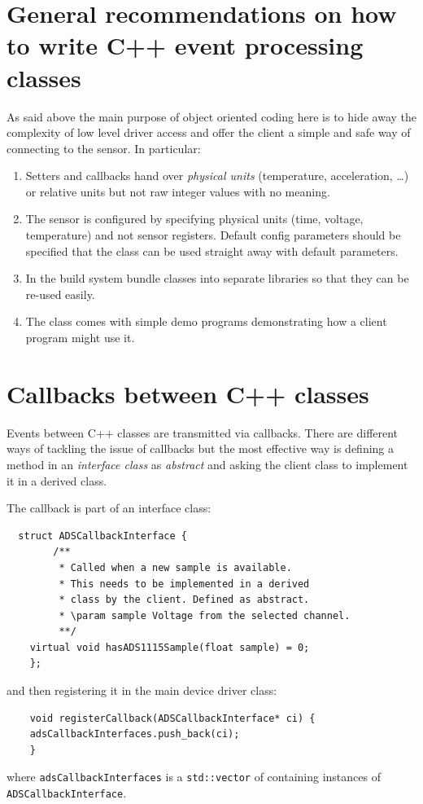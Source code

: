 \documentclass[12pt]{report}
\begin{document}
\section{General recommendations on how to write C++ event processing classes}
As said above the main purpose of object oriented coding here is to
hide away the complexity of low level driver access and offer the
client a simple and safe way of connecting to the sensor. In
particular:
\begin{enumerate}
\item Setters and callbacks hand over \textsl{physical units}
  (temperature, acceleration, \ldots) or relative units but not raw
  integer values with no meaning.
\item The sensor is configured by specifying physical units (time,
  voltage, temperature) and not sensor registers. Default config parameters
  should be specified that the class can be used straight away with
  default parameters.
\item In the build system bundle classes into separate libraries so that they
  can be re-used easily.
\item The class comes with simple demo programs demonstrating how
  a client program might use it.
\end{enumerate}



\section{Callbacks between C++ classes}
Events between C++ classes are transmitted via callbacks.
There are different ways of tackling the issue of callbacks but the
most effective way is defining a method in an \textsl{interface class} as \textsl{abstract} and asking the
client class to implement it in a derived class.

The callback is part of an interface class:
\begin{verbatim}
  struct ADSCallbackInterface {
	    /**
	     * Called when a new sample is available.
	     * This needs to be implemented in a derived
	     * class by the client. Defined as abstract.
	     * \param sample Voltage from the selected channel.
	     **/
	virtual void hasADS1115Sample(float sample) = 0;
    };
\end{verbatim}
and then registering it in the main device driver class:
\begin{verbatim}
    void registerCallback(ADSCallbackInterface* ci) {
	adsCallbackInterfaces.push_back(ci);
    }
\end{verbatim}
where \texttt{adsCallbackInterfaces} is a \texttt{std::vector} of containing instances of
\texttt{ADSCallbackInterface}.
\end{document}
